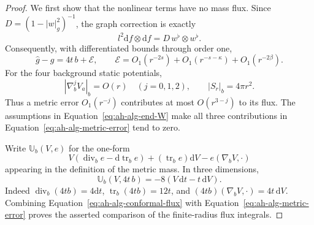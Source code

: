 \begin{proof}
We first show that the nonlinear terms have no mass flux.  Since
\(D=(1-|w|_g^2)^{-1}\), the graph correction is exactly
\[
 l^2\mathrm df\otimes\mathrm df
        =D\,w^\flat\otimes w^\flat .
\]
Consequently, with differentiated bounds through order one,
\begin{equation}
 \widehat g-g=4t\,b+\mathcal E,\qquad
 \mathcal E
    =O_1(r^{-2s})+O_1(r^{-s-\kappa})+O_1(r^{-2\beta}).
 \label{eq:ah-alg-metric-error}
\end{equation}
For the four background static potentials,
\[
 |\nabla_b^jV_a|_b=O(r)\quad(j=0,1,2),\qquad
 |S_r|_b=4\pi r^2.
\]
Thus a metric error \(O_1(r^{-j})\) contributes at most
\(O(r^{3-j})\) to its flux.  The assumptions in
Equation~\eqref{eq:ah-alg-end-W} make all three contributions in
Equation~\eqref{eq:ah-alg-metric-error} tend to zero.

Write \(\mathbb U_b(V,e)\) for the one-form
\[
 V(\operatorname{div}_b e-\mathrm d\operatorname{tr}_b e)
       +(\operatorname{tr}_b e)\mathrm dV
       -e(\nabla_bV,\cdot)
\]
appearing in the definition of the metric mass.  In three dimensions,
\begin{equation}
 \mathbb U_b(V,4t\,b)=-8(V\,\mathrm dt-t\,\mathrm dV).
 \label{eq:ah-alg-conformal-flux}
\end{equation}
Indeed \(\operatorname{div}_b(4tb)=4\mathrm dt\),
\(\operatorname{tr}_b(4tb)=12t\), and
\((4tb)(\nabla_bV,\cdot)=4t\,\mathrm dV\).  Combining
Equation~\eqref{eq:ah-alg-conformal-flux} with
Equation~\eqref{eq:ah-alg-metric-error} proves the asserted
comparison of the finite-radius flux integrals.


\end{proof}
